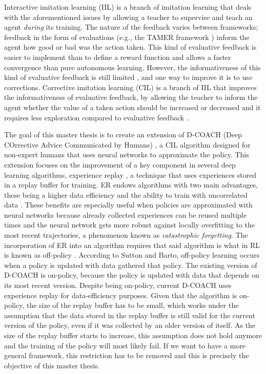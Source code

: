 Interactive imitation learning (IIL) is a branch of imitation learning \cite{lazydagger:2021} that deals with the aforementioned issues by allowing a teacher to supervise and teach an agent \textit{during} its training. The nature of the feedback varies between frameworks; feedback in the form of evaluations (e.g., the TAMER framework \cite{TAMER-Knox-Stone:2009}) inform the agent how good or bad was the action taken. This kind of evaluative feedback is easier to implement than to define a reward function and allows a faster convergence than pure autonomous learning. However, the informativeness of this kind of evaluative feedback is still limited \cite{types-feedback-najar:2020}, and one way to improve it is to use corrections. Corrective imitation learning (CIL) is a branch of IIL that improves the informativeness of evaluative feedback, by allowing the teacher to inform the agent whether the value of a taken action should be increased or decreased \cite{Relative-corrections-Celemin:2019} and it requires less exploration compared to evaluative feedback \cite{types-feedback-najar:2020}.

\setlength{\parskip}{1em}

The goal of this master thesis is to create an extension of D-COACH (Deep COrrective Advice Communicated by Humans) \cite{ResearchAssignmentpaper}, a CIL algorithm designed for non-expert humans that uses neural networks to approximate the policy. This extension focuses on the improvement of a key component in several deep learning algorithms, experience replay \cite{Atari-RL}, a technique that uses experiences stored in a replay buffer for training. ER endows algorithms with two main advantages, these being a higher data efficiency and the ability to train with uncorrelated data \cite{Experience-Replay-zhang:2018}. These benefits are especially useful when policies are approximated with neural networks because already collected experiences can be reused multiple times and the neural network gets more robust against locally overfitting to the most recent trajectories, a phenomenon known as \textit{catastrophic forgetting}. The incorporation of ER into an algorithm requires that said algorithm is what in RL is known as off-policy \cite{Sutton:1998}. According to Sutton and Barto, off-policy learning occurs when a policy is updated with data gathered  that policy. The existing version of D-COACH is on-policy, because the policy is updated with data that depends on its most recent version. Despite being on-policy, current D-COACH uses experience replay for data-efficiency purposes. Given that the algorithm is on-policy, the size of the replay buffer has to be small, which works under the assumption that the data stored in the replay buffer is still valid for the current version of the policy, even if it was collected by an older version of itself. As the size of the replay buffer starts to increase, this assumption does not hold anymore and the training of the policy will most likely fail. If we want to have a more general framework, this restriction has to be removed and this is precisely the objective of this master thesis.






